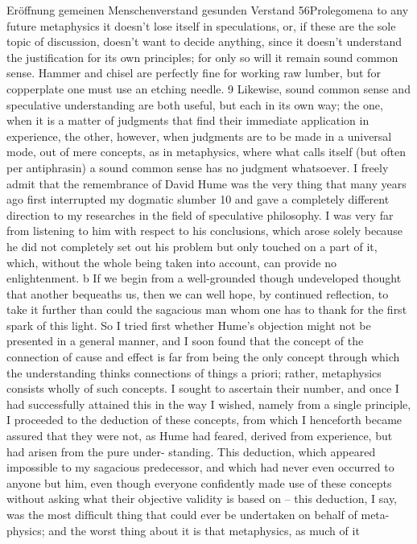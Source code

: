 Eröffnung
gemeinen Menschenverstand
gesunden Verstand
56Prolegomena to any future metaphysics
it doesn’t lose itself in speculations, or, if these are the sole topic of
discussion, doesn’t want to decide anything, since it doesn’t understand
the justiﬁcation for its own principles; for only so will it remain sound
common sense. Hammer and chisel are perfectly ﬁne for working raw
lumber, but for copperplate one must use an etching needle. 9 Likewise,
sound common sense and speculative understanding are both useful,
but each in its own way; the one, when it is a matter of judgments that
ﬁnd their immediate application in experience, the other, however, when
judgments are to be made in a universal mode, out of mere concepts, as
in metaphysics, where what calls itself (but often per antiphrasin) a sound
common sense has no judgment whatsoever.
I freely admit that the remembrance of David Hume was the very
thing that many years ago ﬁrst interrupted my dogmatic slumber 10 and
gave a completely different direction to my researches in the ﬁeld of
speculative philosophy. I was very far from listening to him with respect
to his conclusions, which arose solely because he did not completely set
out his problem but only touched on a part of it, which, without the
whole being taken into account, can provide no enlightenment. b If we
begin from a well-grounded though undeveloped thought that another
bequeaths us, then we can well hope, by continued reﬂection, to take it
further than could the sagacious man whom one has to thank for the ﬁrst
spark of this light.
So I tried ﬁrst whether Hume’s objection might not be presented in a
general manner, and I soon found that the concept of the connection of
cause and effect is far from being the only concept through which the
understanding thinks connections of things a priori; rather, metaphysics
consists wholly of such concepts. I sought to ascertain their number, and
once I had successfully attained this in the way I wished, namely from
a single principle, I proceeded to the deduction of these concepts, from
which I henceforth became assured that they were not, as Hume had
feared, derived from experience, but had arisen from the pure under-
standing. This deduction, which appeared impossible to my sagacious
predecessor, and which had never even occurred to anyone but him, even
though everyone conﬁdently made use of these concepts without asking
what their objective validity is based on – this deduction, I say, was the
most difﬁcult thing that could ever be undertaken on behalf of meta-
physics; and the worst thing about it is that metaphysics, as much of it
